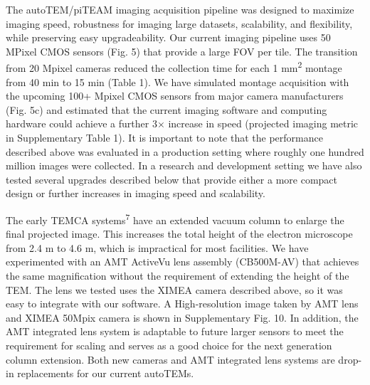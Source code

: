 \documentclass{article}
\begin{document}
The autoTEM/piTEAM imaging acquisition pipeline was designed to maximize imaging speed, robustness for imaging large datasets, scalability, and flexibility, while preserving easy upgradeability. Our current imaging pipeline uses 50 MPixel CMOS sensors (Fig. 5) that provide a large FOV per tile. The transition from 20 Mpixel cameras reduced the collection time for each 1 mm\textsuperscript{2} montage from 40 min to 15 min (Table 1). We have simulated montage acquisition with the upcoming 100+ Mpixel CMOS sensors from major camera manufacturers (Fig. 5c) and estimated that the current imaging software and computing hardware could achieve a further 3× increase in speed (projected imaging metric in Supplementary Table 1). It is important to note that the performance described above was evaluated in a production setting where roughly one hundred million images were collected. In a research and development setting we have also tested several upgrades described below that provide either a more compact design or further increases in imaging speed and scalability.

The early TEMCA systems\textsuperscript{7} have an extended vacuum column to enlarge the final projected image. This increases the total height of the electron microscope from 2.4 m to 4.6 m, which is impractical for most facilities. We have experimented with an AMT ActiveVu lens assembly (CB500M-AV) that achieves the same magnification without the requirement of extending the height of the TEM. The lens we tested uses the XIMEA camera described above, so it was easy to integrate with our software. A High-resolution image taken by AMT lens and XIMEA 50Mpix camera is shown in Supplementary Fig. 10. In addition, the AMT integrated lens system is adaptable to future larger sensors to meet the requirement for scaling and serves as a good choice for the next generation column extension. Both new cameras and AMT integrated lens systems are drop-in replacements for our current autoTEMs.
\end{document}
